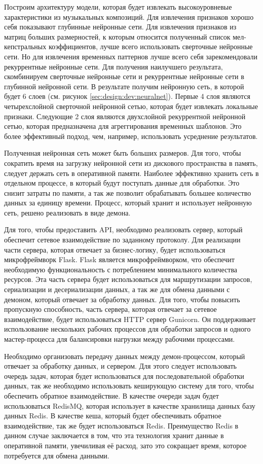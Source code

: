 Построим архитектуру модели, которая будет извлекать высокоуровневые характеристики из музыкальных композиций. Для извлечения признаков хорошо себя показывают глубинные нейронные сети. Для извлечения признаков из матриц больших размерностей, к которым относится полученный список мел-кепстральных коэффициентов, лучше всего использовать сверточные нейронные сети. Но для извлечения временных паттернов лучше всего себя зарекомендовали рекуррентные нейронные сети. Для получения наилучшего результата, скомбинируем сверточные нейронные сети и рекуррентные нейронные сети в глубинной нейронной сети. В результате получим нейронную сеть, в которой будет 6 слоев (см. рисунок \ref{sec:design:dev:neuralnet}). Первые 4 слоя являются четырехслойной сверточной нейронной сетью, которая будет извлекать локальные признаки. Следующие 2 слоя являются двухслойной рекуррентной нейронной сетью, которая предназначена для агреггирования временных шаблонов. Это более эффективный подход, чем, например, использовать усреднение результатов.

Полученная нейронная сеть может быть больших размеров. Для того, чтобы сократить время на загрузку нейронной сети из дискового пространства в память, следует держать сеть в оперативной памяти. Наиболее эффективно хранить сеть в отдельном процессе, в который будут поступать данные для обработки. Это снизит затраты по памяти, а так же позволит обрабатывать большее количество данных за единицу времени. Процесс, который хранит и использует нейронную сеть, решено реализовать в виде демона.

Для того, чтобы предоставить API, необходимо реализовать сервер, который обеспечит сетевое взаимодействие по заданному протоколу. Для реализации части сервера, которая отвечает за бизнес-логику, будет использоваться микрофреймворк Flask. Flask является микрофреймворком, что обеспечит необходимую функциональность с потреблением минимального количества ресурсов. Эта часть сервера будет использоваться для маршрутизации запросов, сериализации и десериализации данных, а так же для обмена данными с демоном, который отвечает за обработку данных. Для того, чтобы повысить пропускную способность, часть сервера, которая отвечает за сетевое взаимодействие, будет использоваться HTTP сервер Gunicorn. Он поддерживает использование нескольких рабочих процессов для обработки запросов и одного мастер-процесса для балансировки нагрузки между рабочими процессами.

Необходимо организовать передачу данных между демон-процессом, который отвечает за обработку данных, и сервером. Для этого следует использовать очередь задач, которая будет использоваться для последовательной обработки данных, так же необходимо использовать кеширующую систему для того, чтобы обеспечить обратное взаимодействие. В качестве очереди задач будет использоваться RedisMQ, которая использует в качестве хранилища данных базу данных Redis. В качестве кеша, который будет обеспечивать обратное взаимодействие, так же будет использоваться Redis. Преимущество Redis в данном случае заключается в том, что эта технология хранит данные в оперативной памяти, увечиливая её расход, зато это сокращает время, которое потребуется для обмена данными.

